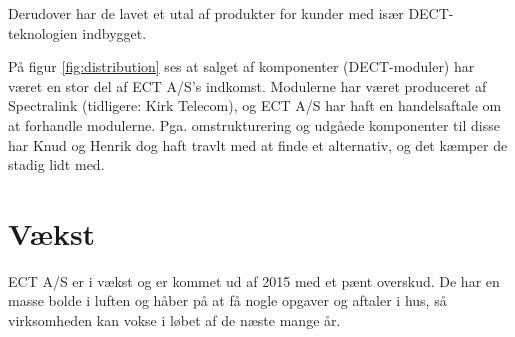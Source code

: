 
Derudover har de lavet et utal af produkter for kunder med især DECT-teknologien indbygget.


På figur \ref{fig:distribution} ses at salget af komponenter (DECT-moduler) har været en stor del af ECT A/S's indkomst. Modulerne har været produceret af Spectralink (tidligere: Kirk Telecom), og ECT A/S har haft en handelsaftale om at forhandle modulerne. Pga. omstrukturering og udgåede komponenter til disse har Knud og Henrik dog haft travlt med at finde et alternativ, og det kæmper de stadig lidt med.

\newpage
\section{Vækst}

ECT A/S er i vækst og er kommet ud af 2015 med et pænt overskud. De har en masse bolde i luften og håber på at få nogle opgaver og aftaler i hus, så virksomheden kan vokse i løbet af de næste mange år. 

